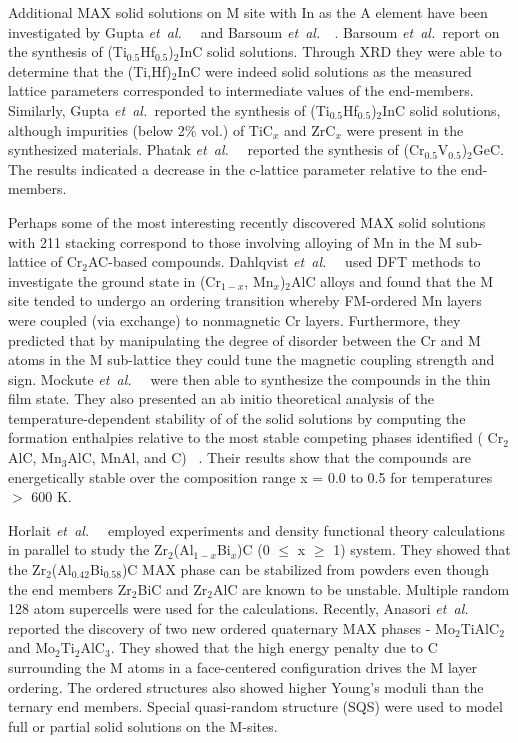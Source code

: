 \documentclass[preprint,amsmath,amssymb,aps, prb,showkeys]{revtex4-1}
\def\etal{\mbox{\it et al.\ }}
\begin{document}
Additional MAX solid solutions on M site with In as the A element have been investigated by Gupta \etal~\cite{gupta2006synthesis} and Barsoum \etal~\cite{barsoum2002fabrication}. Barsoum \etal report on the synthesis of (Ti$_{0.5}$Hf$_{0.5}$)$_2$InC solid solutions. Through XRD they were able to determine that the  (Ti,Hf)$_2$InC were indeed solid solutions as the measured lattice parameters corresponded to intermediate values of the end-members. Similarly, Gupta \etal reported the synthesis of (Ti$_{0.5}$Hf$_{0.5}$)$_2$InC solid solutions, although impurities (below 2\% vol.) of TiC$_x$ and ZrC$_x$ were present in the synthesized materials. Phatak \etal~\cite{phatak2009synthesis} reported the synthesis of (Cr$_{0.5}$V$_{0.5}$)$_2$GeC. The results indicated a decrease in the c-lattice parameter relative to the end-members.

Perhaps some of the most interesting recently discovered MAX solid solutions with 211 stacking correspond to those involving alloying of Mn in the M sub-lattice of Cr$_2$AC-based compounds. Dahlqvist \etal~\cite{dahlqvist2011magnetic} used DFT methods to investigate the ground state in (Cr$_{1-x}$, Mn$_x$)$_2$AlC alloys and found that the M site tended to undergo an ordering transition whereby FM-ordered Mn layers were coupled (via exchange) to nonmagnetic Cr layers. Furthermore, they predicted that by manipulating the degree of disorder between the Cr and M atoms in the M sub-lattice they could tune the magnetic coupling strength and sign. Mockute \etal~\cite{mockute2013synthesis} were then able to synthesize the compounds in the thin film state. They also presented an ab initio theoretical analysis of the temperature-dependent stability of of the solid solutions by computing the formation enthalpies relative to the most stable competing phases identified ( Cr$_2$AlC, Mn$_3$AlC, MnAl, and C) ~\cite{dahlqvist2011magnetic}. Their results show that the compounds are energetically stable over the composition range x = 0.0 to 0.5 for temperatures $>$ 600 K. 

Horlait \etal~\cite{horlait2016synthesis} employed experiments and density functional theory calculations in parallel to study the Zr$_2$(Al$_{1−x}$Bi$_x$)C (0 $\leq$ x $\geq$ 1) system. They showed that  the Zr$_2$(Al$_{0.42}$Bi$_{0.58}$)C MAX phase can be stabilized from powders even though the end members Zr$_2$BiC and Zr$_2$AlC are known to be unstable. Multiple random 128 atom supercells were used for the calculations.
Recently, Anasori \etal~\cite{anasori2015experimental} reported the discovery of two new ordered quaternary MAX phases - Mo$_2$TiAlC$_2$ and Mo$_2$Ti$_2$AlC$_3$. They showed that the  high energy penalty due to C surrounding the M atoms in a face-centered configuration drives the M layer ordering. The ordered structures also showed higher Young's moduli than the ternary end members. Special quasi-random structure (SQS) were used to model full or partial solid solutions on the M-sites. 
\end{document}
